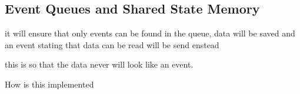 \subsection{Event Queues and Shared State Memory}
\label{sec:EventQueuesandSharedStateMemory}

it will ensure that only events can be found in the queue, data will be saved and an event stating that data can be read will be send enstead

this is so that the data never will look like an event.

How is this implemented
